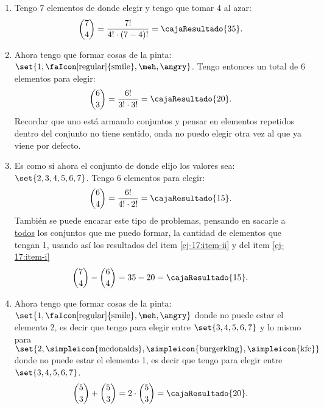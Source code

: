 \begin{enumerate}[label=\roman*)]
  \item\label{ej-17:item-i}  Tengo 7 elementos de donde elegir y tengo que tomar 4 al azar:
        $$\binom{7}{4} =
          \frac{7!}{4! \cdot (7-4)!} =
          \cajaResultado{
            35
          }
          .
        $$

  \item\label{ej-17:item-ii}
        Ahora tengo que formar cosas de la pinta: $\set{1,\text{\faIcon[regular]{smile}}, \text{\meh}, \text{\angry}}$.
        Tengo entonces un total de 6 elementos para elegir:
        $$
          \binom{6}{3} = \frac{6!}{3!\cdot 3!} =
          \cajaResultado{
            20
          }
          .
        $$
        Recordar que uno está armando conjuntos y pensar en elementos repetidos dentro del conjunto no tiene sentido, onda no puedo elegir otra vez al que
        ya viene por defecto.

  \item Es como si ahora el conjunto de donde elijo los valores sea: $\set{2,3,4,5,6,7}$. Tengo 6 elementos para elegir:
        $$
          \binom{6}{4} = \frac{6!}{4!\cdot 2!} =
          \cajaResultado{
            15
          }.
        $$
        También se puede encarar este tipo de problemas, pensando en sacarle a \underline{todos} los conjuntos que me puedo formar,
        la cantidad de elementos que tengan 1, usando así los resultados del item \ref{ej-17:item-ii} y del item \ref{ej-17:item-i}
        $$
          \binom{7}{4} - \binom{6}{4} = 35 - 20 =
          \cajaResultado{
            15
          }.
        $$

  \item
        Ahora tengo que formar cosas de la pinta: $\set{1,\text{\faIcon[regular]{smile}}, \text{\meh}, \text{\angry}}$ donde no puede
        estar el elemento 2, es decir que tengo para elegir entre $\set{3,4,5,6,7}$ y lo mismo para
        $\set{2,\text{\simpleicon{mcdonalds}}, \text{\simpleicon{burgerking}}, \text{\simpleicon{kfc}}}$ donde no puede
        estar el elemento 1, es decir que tengo para elegir entre $\set{3,4,5,6,7}$.
        $$
          \binom{5}{3} +
          \binom{5}{3} =
          2 \cdot \binom{5}{3} =
          \cajaResultado{
            20
          }.
        $$
\end{enumerate}

\begin{aportes}
  \item {}
  \item {}
\end{aportes}
